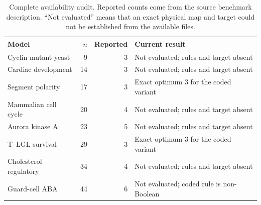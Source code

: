 \begin{table}[!htbp]\centering\small
\caption{Complete availability audit. Reported counts come from the source benchmark description. ``Not evaluated'' means that an exact physical
map and target could not be established from the available files.}
\label{tab:inventory}
\begin{tabular}{p{43mm}rrp{58mm}}
\toprule Model & $n$ & Reported & Current result\\\midrule
Cyclin mutant yeast &9&3&Not evaluated; rules and target absent\\
Cardiac development &14&3&Not evaluated; rules and target absent\\
Segment polarity &17&3&Exact optimum $3$ for the coded variant\\
Mammalian cell cycle &20&4&Not evaluated; rules and target absent\\
Aurora kinase A &23&5&Not evaluated; rules and target absent\\
T--LGL survival &29&3&Exact optimum $3$ for the coded variant\\
Cholesterol regulatory &34&4&Not evaluated; rules and target absent\\
Guard-cell ABA &44&6&Not evaluated; coded rule is non-Boolean\\
\bottomrule\end{tabular}\end{table}

